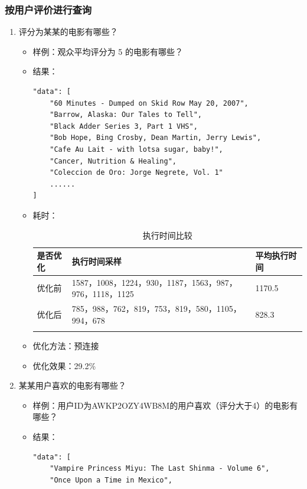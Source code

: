 \documentclass{ctexrep}
\begin{document}
	\subsubsection{按用户评价进行查询}
	    \begin{enumerate}
	        \item 评分为某某的电影有哪些？
    	        \begin{itemize}
    	            \item 样例：观众平均评分为 5 的电影有哪些？
    	            \item 结果：
    	                \begin{lstlisting}
"data": [
    "60 Minutes - Dumped on Skid Row May 20, 2007",
    "Barrow, Alaska: Our Tales to Tell",
    "Black Adder Series 3, Part 1 VHS",
    "Bob Hope, Bing Crosby, Dean Martin, Jerry Lewis",
    "Cafe Au Lait - with lotsa sugar, baby!",
    "Cancer, Nutrition & Healing",
    "Coleccion de Oro: Jorge Negrete, Vol. 1"
    ......
]
    	                \end{lstlisting}
    	            \item 耗时：
    	                \begin{longtable}{l|p{5cm}|l}
    	                    \hline
    	                    是否优化 & 执行时间采样 & 平均执行时间\\
    	                    \hline
    	                    \hline
    	                    优化前 & 1587，1008，1224，930，1187，1563，987，976，1118，1125 & 1170.5\\
    	                    优化后 & 785，988，762，819，753，819，580，1105，994，678 & 828.3\\
    	                    \hline
    	                    \caption{执行时间比较}
    	                \end{longtable}
    	            \item 优化方法：预连接
    	            \item 优化效果：29.2\%
    	        \end{itemize}
	        \item 某某用户喜欢的电影有哪些？
    	        \begin{itemize}
    	            \item 样例：用户ID为AWKP2OZY4WB8M的用户喜欢（评分大于4）的电影有哪些？
    	            \item 结果：
    	                \begin{lstlisting}
"data": [
    "Vampire Princess Miyu: The Last Shinma - Volume 6",
    "Once Upon a Time in Mexico",

\end{lstlisting}
\end{itemize}
\end{enumerate}
\end{document}
